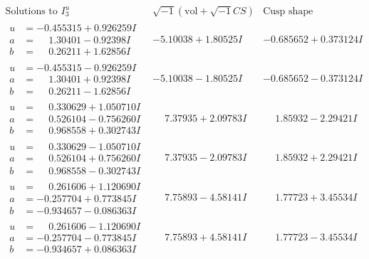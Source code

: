 \documentclass[1p]{elsarticle_modified}
\theoremstyle{definition}
\newcommand{\I}{\sqrt{-1}}
\begin{document}
$$\begin{array}{c|c|c}  
\text{Solutions to }I^u_{3}& \I (\text{vol} + \sqrt{-1}CS) & \text{Cusp shape}\\
 \hline 
\begin{aligned}
u &= -0.455315 + 0.926259 I \\
a &= \phantom{-}1.30401 - 0.92398 I \\
b &= \phantom{-}0.26211 + 1.62856 I\end{aligned}
 & -5.10038 + 1.80525 I & -0.685652 + 0.373124 I \\ \hline\begin{aligned}
u &= -0.455315 - 0.926259 I \\
a &= \phantom{-}1.30401 + 0.92398 I \\
b &= \phantom{-}0.26211 - 1.62856 I\end{aligned}
 & -5.10038 - 1.80525 I & -0.685652 - 0.373124 I \\ \hline\begin{aligned}
u &= \phantom{-}0.330629 + 1.050710 I \\
a &= \phantom{-}0.526104 - 0.756260 I \\
b &= \phantom{-}0.968558 + 0.302743 I\end{aligned}
 & \phantom{-}7.37935 + 2.09783 I & \phantom{-}1.85932 - 2.29421 I \\ \hline\begin{aligned}
u &= \phantom{-}0.330629 - 1.050710 I \\
a &= \phantom{-}0.526104 + 0.756260 I \\
b &= \phantom{-}0.968558 - 0.302743 I\end{aligned}
 & \phantom{-}7.37935 - 2.09783 I & \phantom{-}1.85932 + 2.29421 I \\ \hline\begin{aligned}
u &= \phantom{-}0.261606 + 1.120690 I \\
a &= -0.257704 + 0.773845 I \\
b &= -0.934657 - 0.086363 I\end{aligned}
 & \phantom{-}7.75893 - 4.58141 I & \phantom{-}1.77723 + 3.45534 I \\ \hline\begin{aligned}
u &= \phantom{-}0.261606 - 1.120690 I \\
a &= -0.257704 - 0.773845 I \\
b &= -0.934657 + 0.086363 I\end{aligned}
 & \phantom{-}7.75893 + 4.58141 I & \phantom{-}1.77723 - 3.45534 I \\ \hline\begin{aligned}

\end{aligned}
\end{array}$$
\end{document}
